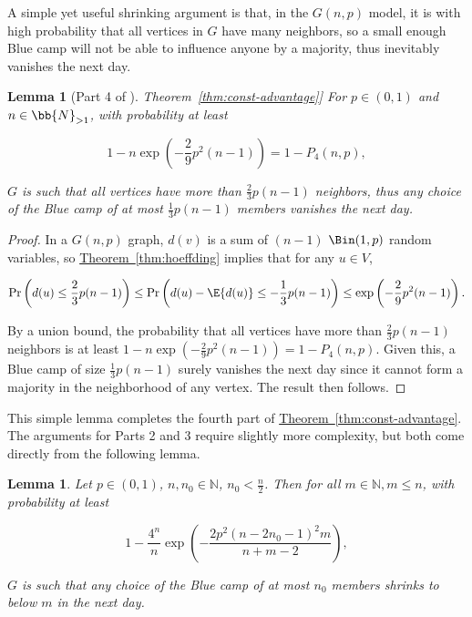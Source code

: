 \documentclass[11pt]{article}
\numberwithin{equation}{section}
\newtheorem{lemma}[theorem]{Lemma}
\theoremstyle{definition}
\theoremstyle{plain}
\newcommand{\expref}[2]{\hyperref[#2]{#1~\ref{#2}}}
\begin{document}
			A simple yet useful shrinking argument is that, in the $G(n, p)$ model,  it is with high probability that all vertices in $G$ have many neighbors, so a small enough Blue camp will not be able to influence anyone by a majority, thus inevitably vanishes the next day.
			
			\begin{lemma}[Part 4 of \expref{Theorem}{thm:const-advantage}] \label{prop:uni-large-linear-advantage}
				For $p\in (0, 1)$ and $n\in \bb{N}_{>1}$, with probability at least
				\begin{linenomath}\begin{equation*}
						1 - n \exp\left(-\frac{2}{9}p^2(n-1)\right) = 1 - P_4(n, p),
				\end{equation*}\end{linenomath}
				$G$ is such that all vertices have more than $\frac{2}{3}p(n - 1)$ neighbors, thus any choice of the Blue camp of at most $\frac{1}{3}p(n - 1)$ members vanishes the next day.
			\end{lemma}
			
			\begin{proof}
				In a $G(n, p)$ graph, $d(v)$ is a sum of $(n-1)$ $\Bin(1, p)$ random variables, so \expref{Theorem}{thm:hoeffding} implies that for any $u\in V$,
				\begin{linenomath}\begin{equation*}
						\Pr\left(d(u)\le \frac{2}{3}p(n-1)\right)
						\le \Pr\left(d(u) - \E{d(u)} \le -\frac{1}{3}p(n-1)\right) \le \exp\left(-\frac{2}{9}p^2(n-1)\right).
				\end{equation*}\end{linenomath}
				By a union bound, the probability that all vertices have more than $\frac{2}{3}p(n-1)$ neighbors is at least $1 - n\exp\left(-\frac{2}{9}p^2(n-1)\right) = 1 - P_4(n, p)$. Given this, a Blue camp of size $\frac{1}{3}p(n-1)$ surely vanishes the next day since it cannot form a majority in 
				the neighborhood of any vertex.  %
				The result then follows.
			\end{proof}
			
			This simple lemma completes the fourth part of \expref{Theorem}{thm:const-advantage}.
			The arguments for Parts 2 and 3 require slightly more complexity, but both come directly from the following lemma.
			
			
			
			\begin{lemma} \label{lem:uni-bad-set-bound}
				Let $p\in (0, 1)$, $n, n_0 \in \mathbb{N}$, $n_0 < \frac{n}{2}$. Then for all $m\in \mathbb{N}, m\le n$, with probability at least
				\begin{linenomath}\begin{equation*}
						1 - \frac{4^n}{n} \exp\left(-\frac{2p^2(n - 2n_0 - 1)^2m}{n + m - 2} \right),
				\end{equation*}\end{linenomath}
				$G$ is such that any choice of the Blue camp of at most $n_0$ members shrinks to below $m$ in the next day.
			\end{lemma}
			
\end{document}

